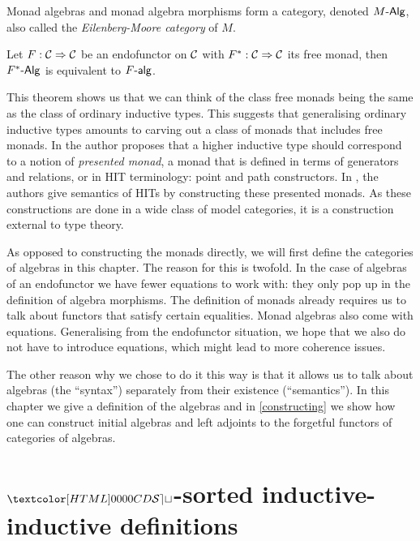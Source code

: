 Monad algebras and monad algebra morphisms form a category, denoted
$\monalgcat{M}$, also called the \emph{Eilenberg-Moore category} of
$M$.

\begin{theorem}
  Let $F : \mathcal{C} \Rightarrow \mathcal{C}$ be an endofunctor on $\mathcal{C}$ with
  $F^* : \mathcal{C} \Rightarrow \mathcal{C}$ its free monad, then $\monalgcat{F^*}$ is
  equivalent to $\algcat{F}$.
\end{theorem}

This theorem shows us that we can think of the class free monads being
the same as the class of ordinary inductive types. This suggests that
generalising ordinary inductive types amounts to carving out a class
of monads that includes free monads. In \cite{Shulman2011} the author
proposes that a higher inductive type should correspond to a notion of
\emph{presented monad}, \ie a monad that is defined in terms of
generators and relations, or in HIT terminology: point and path
constructors. In \cite{Lumsdaine2013}, the authors give semantics of
HITs by constructing these presented monads. As these constructions
are done in a wide class of model categories, it is a construction
external to type theory.

As opposed to constructing the monads directly, we will first define
the categories of algebras in this chapter. The reason for this is
twofold. In the case of algebras of an endofunctor we have fewer
equations to work with: they only pop up in the definition of algebra
morphisms. The definition of monads already requires us to talk about
functors that satisfy certain equalities. Monad algebras also come
with equations. Generalising from the endofunctor situation, we hope
that we also do not have to introduce equations, which might lead to
more coherence issues.

The other reason why we chose to do it this way is that it allows us
to talk about algebras (the ``syntax'') separately from their
existence (``semantics''). In this chapter we give a definition of the
algebras and in \cref{constructing} we show how one can construct
initial algebras and left adjoints to the forgetful functors of
categories of algebras.

\section{$\SET$-sorted inductive-inductive definitions}
\label{set-sorted-inductive-inductive-definitions}

